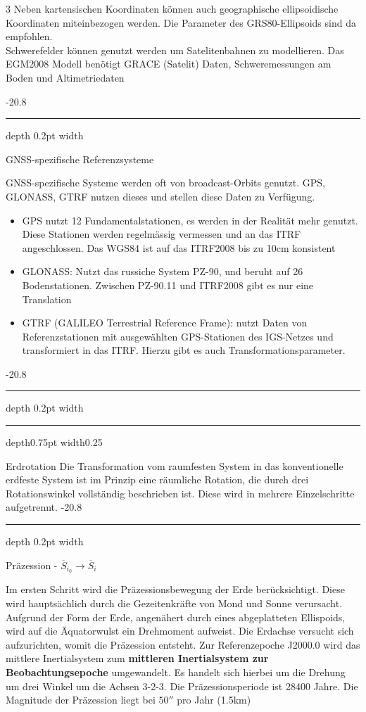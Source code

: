 \documentclass[9pt, landscape, fleqn]{scrartcl}
\makeatletter
\renewcommand{\subsection}{\@startsection{subsection}{1}{0mm}%
{-2\baselineskip}{0.8\baselineskip}%
{\hrule depth 0.2pt width\columnwidth\hrule depth0.75pt
width0.25\columnwidth\vspace*{1.2em}\large\bfseries\rmfamily}}
\renewcommand{\subsubsection}{\@startsection{subsubsection}{1}{0mm}%
{-2\baselineskip}{0.8\baselineskip}%
{\hrule depth 0.2pt width\columnwidth\vspace*{1.2em}\normalsize\bfseries\rmfamily}}
\makeatother
\begin{document}
\begin{multicols*}{3}
Neben kartensischen Koordinaten können auch geographische ellipsoidische Koordinaten miteinbezogen werden. Die Parameter des GRS80-Ellipsoids sind da empfohlen. \\ 

Schwerefelder können genutzt werden um Satelitenbahnen zu modellieren. Das EGM2008 Modell benötigt GRACE (Satelit) Daten, Schweremessungen am Boden und Altimetriedaten

\subsubsection{GNSS-spezifische Referenzsysteme}

GNSS-spezifische Systeme werden oft von broadcast-Orbits genutzt. GPS, GLONASS, GTRF nutzen dieses und stellen diese Daten zu Verfügung. 

\begin{itemize}
    \item GPS nutzt 12 Fundamentalstationen, es werden in der Realität mehr genutzt. Diese Stationen werden regelmässig vermessen und an das ITRF angeschlossen. Das WGS84 ist auf das ITRF2008 bis zu 10cm konsistent
    \item GLONASS: Nutzt das russiche System PZ-90, und beruht auf 26 Bodenstationen. Zwischen PZ-90.11 und ITRF2008 gibt es nur eine Translation
    \item GTRF (GALILEO Terrestrial Reference Frame): nutzt Daten von Referenzstationen mit ausgewählten GPS-Stationen des IGS-Netzes und transformiert in das ITRF. Hierzu gibt es auch Transformationsparameter.
\end{itemize}

\subsection{Erdrotation}
Die Transformation vom raumfesten System in das konventionelle erdfeste System ist im Prinzip eine räumliche Rotation, die durch drei Rotationswinkel vollständig beschrieben ist. Diese wird in mehrere Einzelschritte aufgetrennt.
\subsubsection{Präzession - $\overline{S}_{i_0} \rightarrow \overline{S}_{i}$}

Im ersten Schritt wird die Präzessionsbewegung der Erde berücksichtigt. Diese wird hauptsächlich durch die Gezeitenkräfte von Mond und Sonne verursacht. Aufgrund der Form der Erde, angenähert durch eines abgeplatteten Ellispoids, wird auf die Äquatorwulst ein Drehmoment aufweist. Die Erdachse versucht sich aufzurichten, womit die Präzession entsteht. Zur Referenzepoche J2000.0 wird das mittlere Inertialsystem zum \textbf{mittleren Inertialsystem zur Beobachtungsepoche} umgewandelt. Es handelt sich hierbei um die Drehung um drei Winkel um die Achsen 3-2-3. Die Präzessionsperiode ist 28400 Jahre. Die Magnitude der Präzession liegt bei $50''$ pro Jahr (1.5km)


\end{multicols*}
\end{document}
